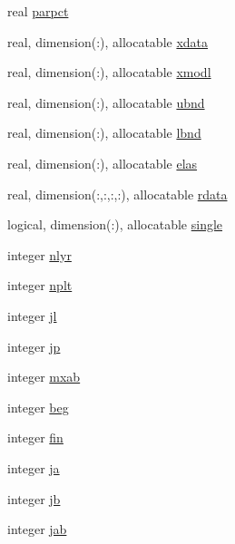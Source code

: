 \begin{DoxyCompactItemize}
\item 
real \hyperlink{namespacelg__input__routines_a17fa14f47c0c3b7209482e10238fa8b8}{parpct}
\item 
real, dimension(\+:), allocatable \hyperlink{namespacelg__input__routines_af1d98dc71b47044d85f3f75345bd4ad5}{xdata}
\item 
real, dimension(\+:), allocatable \hyperlink{namespacelg__input__routines_ae31b5c3866f71b018a3e0dc5d4c63e6c}{xmodl}
\item 
real, dimension(\+:), allocatable \hyperlink{namespacelg__input__routines_a53f662035d1167d4af1fc7834120a430}{ubnd}
\item 
real, dimension(\+:), allocatable \hyperlink{namespacelg__input__routines_ae4125e25f60f0e4a3f3a59c66c9896ac}{lbnd}
\item 
real, dimension(\+:), allocatable \hyperlink{namespacelg__input__routines_a45d7d9feedc943e6eeb7c96241a56cb9}{elas}
\item 
real, dimension(\+:,\+:,\+:,\+:), allocatable \hyperlink{namespacelg__input__routines_a6f87e762092d8ff698807f2ad59f2af3}{rdata}
\item 
logical, dimension(\+:), allocatable \hyperlink{namespacelg__input__routines_a09029b4bdcd2d8c5ae75d95f22599c0f}{single}
\item 
integer \hyperlink{namespacelg__input__routines_a6db35964e1d4e1d73b76f93d728b96e9}{nlyr}
\item 
integer \hyperlink{namespacelg__input__routines_ac4f7a7edd592899c2e3180d01abdb6ec}{nplt}
\item 
integer \hyperlink{namespacelg__input__routines_a43617bbf513a31819fdd9102f2d14960}{jl}
\item 
integer \hyperlink{namespacelg__input__routines_afca0d53e4281898737d338026b40e53d}{jp}
\item 
integer \hyperlink{namespacelg__input__routines_a7a11100cb9dbcf30ddd8ea9802e951c7}{mxab}
\item 
integer \hyperlink{namespacelg__input__routines_ad240d679ecd403cc52aac764201bfc5b}{beg}
\item 
integer \hyperlink{namespacelg__input__routines_a67371f9c06d68b95d45184555688f5da}{fin}
\item 
integer \hyperlink{namespacelg__input__routines_aee9292c01f55d537f7cafc9a3e5201bf}{ja}
\item 
integer \hyperlink{namespacelg__input__routines_a3d09f96b92b5909671209cf341d8939f}{jb}
\item 
integer \hyperlink{namespacelg__input__routines_a2b02a6181257c199eba71b3c92fb5be9}{jab}

\end{DoxyCompactItemize}
